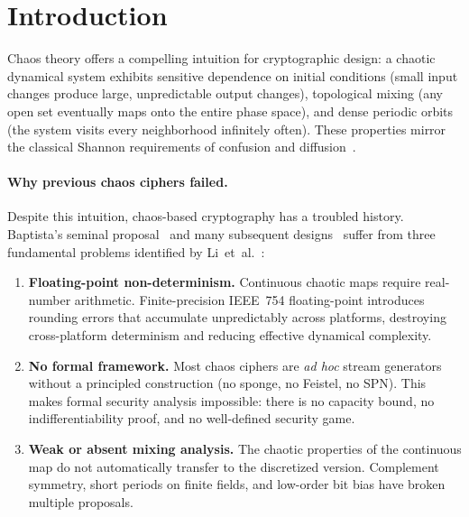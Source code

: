 \documentclass[runningheads]{llncs}
\begin{document}
\section{Introduction}
\label{sec:intro}

Chaos theory offers a compelling intuition for cryptographic design:
a chaotic dynamical system exhibits sensitive dependence on initial conditions
(small input changes produce large, unpredictable output changes), topological
mixing (any open set eventually maps onto the entire phase space), and dense
periodic orbits (the system visits every neighborhood infinitely often).
These properties mirror the classical Shannon requirements of confusion and
diffusion~\cite{shannon1949communication}.

\paragraph{Why previous chaos ciphers failed.}
Despite this intuition, chaos-based cryptography has a troubled history.
Baptista's seminal proposal~\cite{baptista1998cryptography} and many subsequent
designs~\cite{kocarev2001chaos,fridrich1998symmetric,chen2004symmetric}
suffer from three fundamental problems identified by Li~et~al.~\cite{li2001problems}:
\begin{enumerate}[nosep]
\item \textbf{Floating-point non-determinism.}
  Continuous chaotic maps require real-number arithmetic.
  Finite-precision IEEE~754 floating-point introduces rounding errors that
  accumulate unpredictably across platforms, destroying cross-platform
  determinism and reducing effective dynamical complexity.
\item \textbf{No formal framework.}
  Most chaos ciphers are \emph{ad hoc} stream generators without a
  principled construction (no sponge, no Feistel, no SPN).
  This makes formal security analysis impossible: there is no capacity
  bound, no indifferentiability proof, and no well-defined security game.
\item \textbf{Weak or absent mixing analysis.}
  The chaotic properties of the continuous map do not automatically transfer
  to the discretized version.  Complement symmetry, short periods on finite
  fields, and low-order bit bias have broken multiple proposals.
\end{enumerate}
\end{document}

